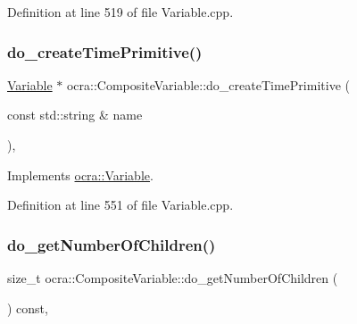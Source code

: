 Definition at line 519 of file Variable.\+cpp.

\hypertarget{classocra_1_1CompositeVariable_a09fb82df36205326b995aca1dd8f14ba}{}\label{classocra_1_1CompositeVariable_a09fb82df36205326b995aca1dd8f14ba} 
\subsubsection{\texorpdfstring{do\+\_\+create\+Time\+Primitive()}{do\_createTimePrimitive()}}
{\footnotesize\ttfamily \hyperlink{classocra_1_1Variable}{Variable} $\ast$ ocra\+::\+Composite\+Variable\+::do\+\_\+create\+Time\+Primitive (\begin{DoxyParamCaption}\item[{const std\+::string \&}]{name }\end{DoxyParamCaption})\hspace{0.3cm}{\ttfamily [protected]}, {\ttfamily [virtual]}}



Implements \hyperlink{classocra_1_1Variable_ae37610cbde7630dcda3dd6e09e251057}{ocra\+::\+Variable}.



Definition at line 551 of file Variable.\+cpp.

\hypertarget{classocra_1_1CompositeVariable_aa61eea64fe90aea3ebccad355a9e8fb0}{}\label{classocra_1_1CompositeVariable_aa61eea64fe90aea3ebccad355a9e8fb0} 
\subsubsection{\texorpdfstring{do\+\_\+get\+Number\+Of\+Children()}{do\_getNumberOfChildren()}}
{\footnotesize\ttfamily size\+\_\+t ocra\+::\+Composite\+Variable\+::do\+\_\+get\+Number\+Of\+Children (\begin{DoxyParamCaption}{ }\end{DoxyParamCaption}) const\hspace{0.3cm}{\ttfamily [protected]}, {\ttfamily [virtual]}}



